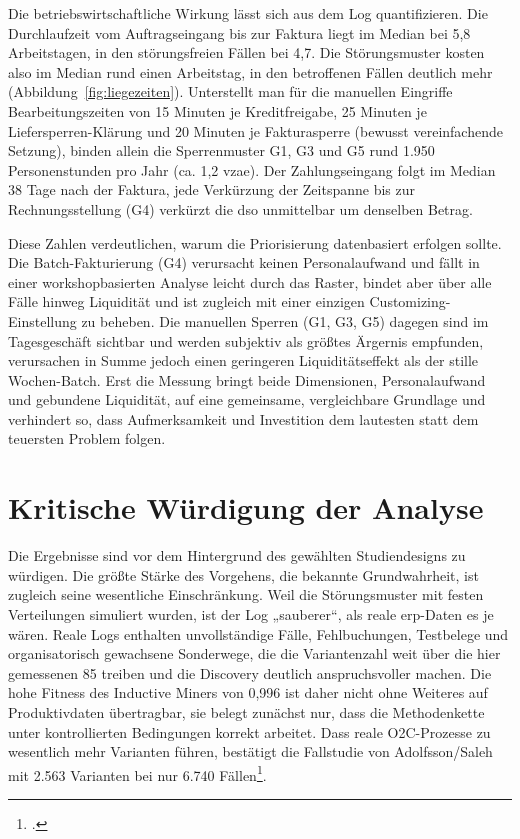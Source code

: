 Die betriebswirtschaftliche Wirkung lässt sich aus dem Log quantifizieren. Die Durchlaufzeit vom Auftragseingang bis zur Faktura liegt im Median bei 5,8 Arbeitstagen, in den störungsfreien Fällen bei 4,7. Die Störungsmuster kosten also im Median rund einen Arbeitstag, in den betroffenen Fällen deutlich mehr (Abbildung~\ref{fig:liegezeiten}). Unterstellt man für die manuellen Eingriffe Bearbeitungszeiten von 15 Minuten je Kreditfreigabe, 25 Minuten je Liefersperren-Klärung und 20 Minuten je Fakturasperre (bewusst vereinfachende Setzung), binden allein die Sperrenmuster G1, G3 und G5 rund 1.950 Personenstunden pro Jahr (ca. 1,2 \gls{vzae}). Der Zahlungseingang folgt im Median 38 Tage nach der Faktura, jede Verkürzung der Zeitspanne bis zur Rechnungsstellung (G4) verkürzt die \gls{dso} unmittelbar um denselben Betrag.

Diese Zahlen verdeutlichen, warum die Priorisierung datenbasiert erfolgen sollte. Die Batch-Fakturierung (G4) verursacht keinen Personalaufwand und fällt in einer workshopbasierten Analyse leicht durch das Raster, bindet aber über alle Fälle hinweg Liquidität und ist zugleich mit einer einzigen Customizing-Einstellung zu beheben. Die manuellen Sperren (G1, G3, G5) dagegen sind im Tagesgeschäft sichtbar und werden subjektiv als größtes Ärgernis empfunden, verursachen in Summe jedoch einen geringeren Liquiditätseffekt als der stille Wochen-Batch. Erst die Messung bringt beide Dimensionen, Personalaufwand und gebundene Liquidität, auf eine gemeinsame, vergleichbare Grundlage und verhindert so, dass Aufmerksamkeit und Investition dem lautesten statt dem teuersten Problem folgen.

\section{Kritische Würdigung der Analyse}\label{sec:kritische-wuerdigung}

Die Ergebnisse sind vor dem Hintergrund des gewählten Studiendesigns zu würdigen. Die größte Stärke des Vorgehens, die bekannte Grundwahrheit, ist zugleich seine wesentliche Einschränkung. Weil die Störungsmuster mit festen Verteilungen simuliert wurden, ist der Log „sauberer“, als reale \gls{erp}-Daten es je wären. Reale Logs enthalten unvollständige Fälle, Fehlbuchungen, Testbelege und organisatorisch gewachsene Sonderwege, die die Variantenzahl weit über die hier gemessenen 85 treiben und die Discovery deutlich anspruchsvoller machen. Die hohe Fitness des Inductive Miners von 0,996 ist daher nicht ohne Weiteres auf Produktivdaten übertragbar, sie belegt zunächst nur, dass die Methodenkette unter kontrollierten Bedingungen korrekt arbeitet. Dass reale O2C-Prozesse zu wesentlich mehr Varianten führen, bestätigt die Fallstudie von Adolfsson/Saleh mit 2.563 Varianten bei nur 6.740 Fällen\footcite[Vgl.][S.~44 ff.]{adolfsson2026o2c}.

